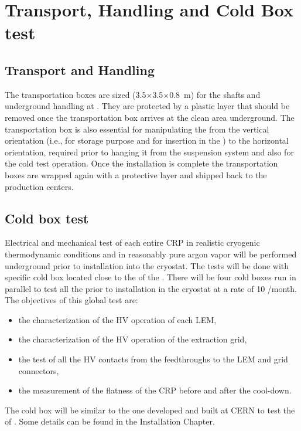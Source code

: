 \section{Transport, Handling and Cold Box test}
\label{sec:dp-crp-transport}

\subsection{Transport and Handling}
 \label{sec:dp-crp-transport}
 
The transportation boxes are sized (\num{3.5}$\times$\num{3.5}$\times$\SI{0.8}{m}) for the shafts and underground handling at \surf{}.
They are protected by a plastic layer that should be removed once the transportation box arrives at the clean area 
underground. The transportation box is also essential for manipulating the  from the vertical orientation (i.e., for storage purpose and for insertion in the ) to the horizontal orientation, required 
 prior to hanging it from the suspension system and also for the cold test operation. Once the installation is complete the transportation boxes are wrapped again with a protective layer and shipped back to the production centers. 

\subsection{Cold box test}
 \label{sec:dp-crp-coldboxtest}
Electrical and mechanical test of each entire CRP in realistic cryogenic thermodynamic conditions and in reasonably pure argon vapor will be performed underground prior to installation into the cryostat. The tests will be done with  specific cold box located close to the  of the \dpmod. There will be four cold boxes run in parallel to test  all the  prior to installation in the cryostat at a rate of 10 /month.
The objectives of this global  test are:
\begin{itemize}
\item the characterization of the HV operation of each LEM,
\item the characterization of the HV operation of the extraction grid,
\item the test of all the HV contacts from the feedthroughs to the LEM and grid connectors,
\item the measurement of the flatness of the CRP before and after the cool-down.
\end{itemize}
The cold box will be similar to the one developed and built at CERN  to test the  of . Some details can be found in the Installation Chapter.

